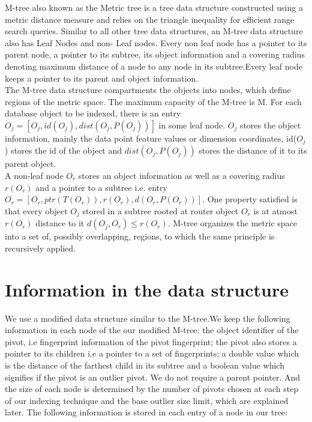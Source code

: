 

M-tree also known as the Metric tree is a tree data structure constructed using a metric distance measure and relies on the triangle inequality for efficient range search queries. Similar to all other tree data structures, an M-tree data structure also has Leaf Nodes and non- Leaf nodes. Every non leaf node has a pointer to its parent node, a pointer to its subtree, its object information and a covering radius denoting maximum distance of a node to any node in its subtree.Every leaf node keeps a pointer to its parent and object information.\\

The M-tree data structure compartments the objects into nodes, which define regions of the metric space. The maximum capacity of the M-tree is M. For each database object to be indexed, there is an entry $O_j = [ O_j, id(O_j), dist(O_j , P(O_j )) ]$
in some leaf node.  $O_j$ stores the object information, mainly the data point feature values or dimension coordinates, id($O_j$) stores the id of the object and $dist(O_j , P(O_j ))$ stores the distance of it to its parent object. \\

A non-leaf node $O_r$ stores an object information as well as a covering radius $r(O_r)$ and a pointer to a subtree i.e. entry $O_r=[ O_r, ptr(T(O_r)), r(O_r), d(O_r, P(O_r)) ]$. One property satisfied is that every object $O_j$ stored in a subtree rooted at router object $O_r$ is at atmost $r(O_r)$ distance to it $d(O_j , O_r) ≤ r(O_r)$. M-tree organizes the metric space into a set of, possibly overlapping, regions, to which the same principle is recursively applied.\\


\section{Information in the data structure}

We use a modified data structure similar to the M-tree.We keep the following information in each node of the our modified M-tree: the object identifier of the pivot, i.e fingerprint information of the pivot fingerprint; the pivot also stores a pointer to its children i.e a pointer to a set of fingerprints; a double value which is the distance of the farthest child in its subtree and a boolean value which signifies if the pivot is an outlier pivot. We do not require a parent pointer. And the size of each node is determined by the number of pivots chosen at each step of our indexing technique and the base outlier size limit, which are explained later. The following information is stored in each entry of a node in our tree:

